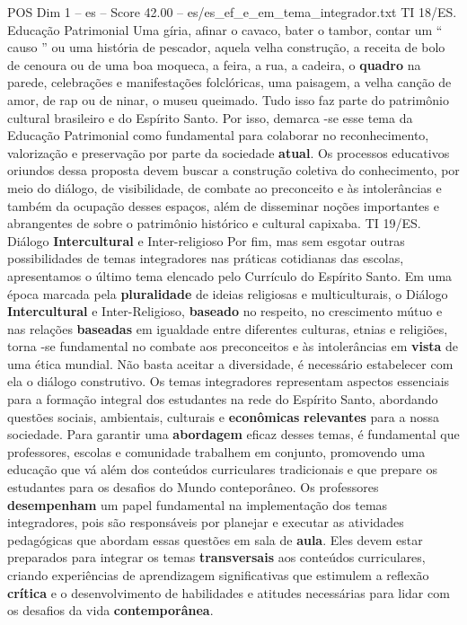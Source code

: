 \begin{textsample}{POS Dim 1 – es – Score 42.00 – es/es\_ef\_e\_em\_tema\_integrador.txt}
TI 18/ES.
Educação Patrimonial Uma gíria, afinar o cavaco, bater o tambor, contar um “ causo ” ou uma história de pescador, aquela velha construção, a receita de bolo de cenoura ou de uma boa moqueca, a feira, a rua, a cadeira, o \textbf{quadro} na parede, celebrações e manifestações folclóricas, uma paisagem, a velha canção de amor, de rap ou de ninar, o museu queimado.
Tudo isso faz parte do patrimônio cultural brasileiro e do Espírito Santo.
Por isso, demarca -se esse tema da Educação Patrimonial como fundamental para colaborar no reconhecimento, valorização e preservação por parte da sociedade \textbf{atual}.
Os processos educativos oriundos dessa proposta devem buscar a construção coletiva do conhecimento, por meio do diálogo, de visibilidade, de combate ao preconceito e às intolerâncias e também da ocupação desses espaços, além de disseminar noções importantes e abrangentes de sobre o patrimônio histórico e cultural capixaba.
TI 19/ES.
Diálogo \textbf{Intercultural} e Inter-religioso Por fim, mas sem esgotar outras possibilidades de temas integradores nas práticas cotidianas das escolas, apresentamos o último tema elencado pelo Currículo do Espírito Santo.
Em uma época marcada pela \textbf{pluralidade} de ideias religiosas e multiculturais, o Diálogo \textbf{Intercultural} e Inter-Religioso, \textbf{baseado} no respeito, no crescimento mútuo e nas relações \textbf{baseadas} em igualdade entre diferentes culturas, etnias e religiões, torna -se fundamental no combate aos preconceitos e às intolerâncias em \textbf{vista} de uma ética mundial.
Não basta aceitar a diversidade, é necessário estabelecer com ela o diálogo construtivo.
Os temas integradores representam aspectos essenciais para a formação integral dos estudantes na rede do Espírito Santo, abordando questões sociais, ambientais, culturais e \textbf{econômicas} \textbf{relevantes} para a nossa sociedade.
Para garantir uma \textbf{abordagem} eficaz desses temas, é fundamental que professores, escolas e comunidade trabalhem em conjunto, promovendo uma educação que vá além dos conteúdos curriculares tradicionais e que prepare os estudantes para os desafios do Mundo conteporâneo.
Os professores \textbf{desempenham} um papel fundamental na implementação dos temas integradores, pois são responsáveis por planejar e executar as atividades pedagógicas que abordam essas questões em sala de \textbf{aula}.
Eles devem estar preparados para integrar os temas \textbf{transversais} aos conteúdos curriculares, criando experiências de aprendizagem significativas que estimulem a reflexão \textbf{crítica} e o desenvolvimento de habilidades e atitudes necessárias para lidar com os desafios da vida \textbf{contemporânea}.

\end{textsample}
